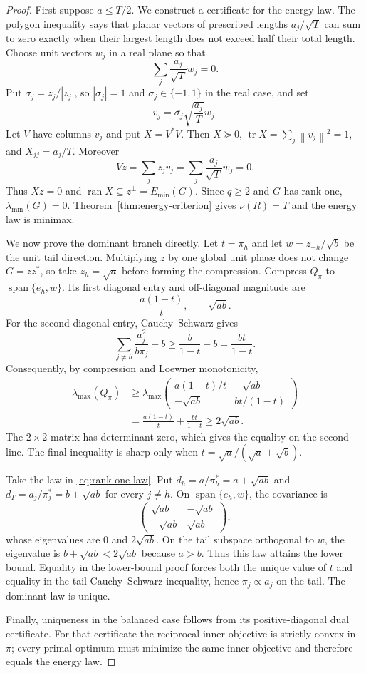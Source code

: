 \documentclass[11pt]{article}
\theoremstyle{definition}
\newcommand{\tr}{\operatorname{tr}}
\newcommand{\ran}{\operatorname{ran}}
\newcommand{\norm}[1]{\left\lVert #1\right\rVert}
\begin{document}
\begin{proof}
First suppose $a\le T/2$.  We construct a certificate for the energy law.  The polygon
inequality says that planar vectors of prescribed lengths $a_j/\sqrt T$ can sum to zero exactly
when their largest length does not exceed half their total length.  Choose unit vectors $w_j$ in
a real plane so that
\[
  \sum_j\frac{a_j}{\sqrt T}w_j=0.
\]
Put $\sigma_j=z_j/|z_j|$, so $|\sigma_j|=1$ and $\sigma_j\in\{-1,1\}$ in the real case, and set
\[
  v_j=\overline{\sigma_j}\sqrt{\frac{a_j}{T}}w_j.
\]
Let $V$ have columns $v_j$ and put $X=V^*V$.  Then $X\succeq0$,
$\tr X=\sum_j\norm{v_j}^2=1$, and $X_{jj}=a_j/T$.  Moreover
\[
  Vz=\sum_jz_jv_j
  =\sum_j\frac{a_j}{\sqrt T}w_j=0.
\]
Thus $Xz=0$ and $\ran X\subseteq z^\perp=E_{\min}(G)$.  Since $q\ge2$ and $G$ has rank one,
$\lambda_{\min}(G)=0$.  Theorem~\ref{thm:energy-criterion} gives
$\nu(R)=T$ and the energy law is minimax.

We now prove the dominant branch directly.  Let $t=\pi_h$ and let
$w=z_{-h}/\sqrt b$ be the unit tail direction.  Multiplying $z$ by one global unit phase does not
change $G=zz^*$, so take $z_h=\sqrt a$ before forming the compression.  Compress $Q_\pi$ to
$\operatorname{span}\{e_h,w\}$.  Its first diagonal entry and off-diagonal magnitude are
\[
  \frac{a(1-t)}{t},\qquad \sqrt{ab}.
\]
For the second diagonal entry, Cauchy--Schwarz gives
\[
  \sum_{j\ne h}\frac{a_j^2}{b\pi_j}-b
  \ge\frac{b}{1-t}-b=\frac{bt}{1-t}.
\]
Consequently, by compression and Loewner monotonicity,
\begin{align*}
  \lambda_{\max}(Q_\pi)
  &\ge
  \lambda_{\max}
  \begin{pmatrix}
    a(1-t)/t&-\sqrt{ab}\\
    -\sqrt{ab}&bt/(1-t)
  \end{pmatrix}\\
  &=\frac{a(1-t)}{t}+\frac{bt}{1-t}
  \ge2\sqrt{ab}.
\end{align*}
The $2\times2$ matrix has determinant zero, which gives the equality on the second line.
The final inequality is sharp only when
$t=\sqrt a/(\sqrt a+\sqrt b)$.

Take the law in \eqref{eq:rank-one-law}.  Put
$d_h=a/\pi_h^*=a+\sqrt{ab}$ and
$d_T=a_j/\pi_j^*=b+\sqrt{ab}$ for every $j\ne h$.  On
$\operatorname{span}\{e_h,w\}$, the covariance is
\[
  \begin{pmatrix}
    \sqrt{ab}&-\sqrt{ab}\\
    -\sqrt{ab}&\sqrt{ab}
  \end{pmatrix},
\]
whose eigenvalues are $0$ and $2\sqrt{ab}$.  On the tail subspace orthogonal to $w$, the
eigenvalue is $b+\sqrt{ab}<2\sqrt{ab}$ because $a>b$.  Thus this law attains the lower bound.
Equality in the lower-bound proof forces both the unique value of $t$ and equality in the tail
Cauchy--Schwarz inequality, hence $\pi_j\propto a_j$ on the tail.  The dominant law is unique.

Finally, uniqueness in the balanced case follows from its positive-diagonal dual certificate.
For that certificate the reciprocal inner objective is strictly convex in $\pi$; every primal
optimum must minimize the same inner objective and therefore equals the energy law.
\end{proof}
\end{document}
